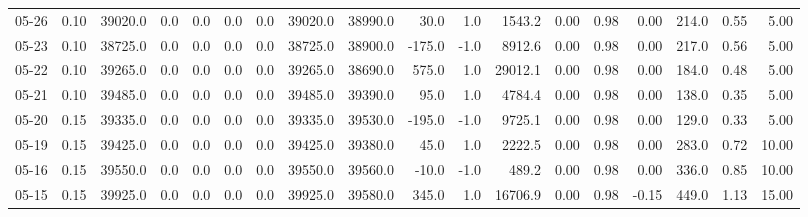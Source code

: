 \begin{threeparttable}
{\begin{tabular}{lrrrrrrrrrrrrrrrrr}
  05-26 &     0.10 & 39020.0 &               0.0 &               0.0 &                0.0 &                0.0 & 39020.0 & 38990.0 &       30.0 &                      1.0 &              1543.2 &       0.00 &      0.98 &           0.00 &            214.0 &            0.55 &                   5.00 \\
  05-23 &     0.10 & 38725.0 &               0.0 &               0.0 &                0.0 &                0.0 & 38725.0 & 38900.0 &     -175.0 &                     -1.0 &              8912.6 &       0.00 &      0.98 &           0.00 &            217.0 &            0.56 &                   5.00 \\
  05-22 &     0.10 & 39265.0 &               0.0 &               0.0 &                0.0 &                0.0 & 39265.0 & 38690.0 &      575.0 &                      1.0 &             29012.1 &       0.00 &      0.98 &           0.00 &            184.0 &            0.48 &                   5.00 \\
  05-21 &     0.10 & 39485.0 &               0.0 &               0.0 &                0.0 &                0.0 & 39485.0 & 39390.0 &       95.0 &                      1.0 &              4784.4 &       0.00 &      0.98 &           0.00 &            138.0 &            0.35 &                   5.00 \\
  05-20 &     0.15 & 39335.0 &               0.0 &               0.0 &                0.0 &                0.0 & 39335.0 & 39530.0 &     -195.0 &                     -1.0 &              9725.1 &       0.00 &      0.98 &           0.00 &            129.0 &            0.33 &                   5.00 \\
  05-19 &     0.15 & 39425.0 &               0.0 &               0.0 &                0.0 &                0.0 & 39425.0 & 39380.0 &       45.0 &                      1.0 &              2222.5 &       0.00 &      0.98 &           0.00 &            283.0 &            0.72 &                  10.00 \\
  05-16 &     0.15 & 39550.0 &               0.0 &               0.0 &                0.0 &                0.0 & 39550.0 & 39560.0 &      -10.0 &                     -1.0 &               489.2 &       0.00 &      0.98 &           0.00 &            336.0 &            0.85 &                  10.00 \\
  05-15 &     0.15 & 39925.0 &               0.0 &               0.0 &                0.0 &                0.0 & 39925.0 & 39580.0 &      345.0 &                      1.0 &             16706.9 &       0.00 &      0.98 &          -0.15 &            449.0 &            1.13 &                  15.00 \\

\end{tabular}}
\end{threeparttable}
